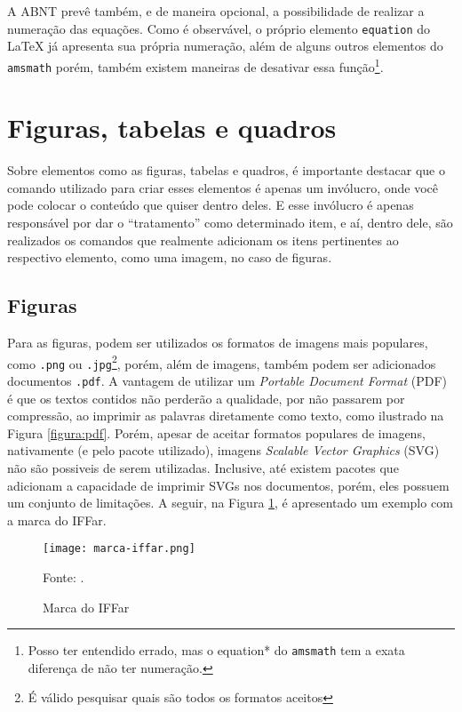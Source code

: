   A ABNT prevê também, e de maneira opcional, a possibilidade de realizar a numeração das equações. Como é observável, o próprio elemento \texttt{equation} do \LaTeX{} já apresenta sua própria numeração, além de alguns outros elementos do \texttt{amsmath} porém, também existem maneiras de desativar essa função\footnote{Posso ter entendido errado, mas o equation* do \texttt{amsmath} tem a exata diferença de não ter numeração.}.

\section{Figuras, tabelas e quadros}
  Sobre elementos como as figuras, tabelas e quadros, é importante destacar que o comando utilizado para criar esses elementos é apenas um invólucro, onde você pode colocar o conteúdo que quiser dentro deles. E esse invólucro é apenas responsável por dar o ``tratamento'' como determinado item, e aí, dentro dele, são realizados os comandos que realmente adicionam os itens pertinentes ao respectivo elemento, como uma imagem, no caso de figuras.
  
\subsection{Figuras}
  Para as figuras, podem ser utilizados os formatos de imagens mais populares, como \verb|.png| ou \verb|.jpg|\footnote{É válido pesquisar quais são todos os formatos aceitos}, porém, além de imagens, também podem ser adicionados documentos \verb|.pdf|. A vantagem de utilizar um \textit{Portable Document Format} (PDF) é que os textos contidos não perderão a qualidade, por não passarem por compressão, ao imprimir as palavras diretamente como texto, como ilustrado na Figura \ref{figura:pdf}. Porém, apesar de aceitar formatos populares de imagens, nativamente (e pelo pacote utilizado), imagens \textit{Scalable Vector Graphics} (SVG) não são possiveis de serem utilizadas. Inclusive, até existem pacotes que adicionam a capacidade de imprimir SVGs nos documentos, porém, eles possuem um conjunto de limitações\footnotemark. A seguir, na Figura \ref{figura:marca-iffar}, é apresentado um exemplo com a marca do IFFar.

  \begin{figure}[H]
    \Centering\singlespacing
    \caption{Marca do IFFar}
    \label{figura:marca-iffar} %
    \texttt{[image: marca-iffar.png]}

    \footnotesize
    Fonte: \textcite{site:iffar-identidade-visual-2021}.
  \end{figure}

